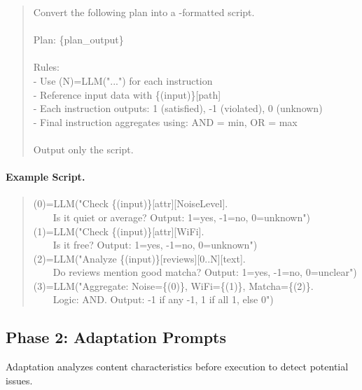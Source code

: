 \begin{quote}
\small\ttfamily
Convert the following plan into a \script-formatted script.\\
\\
Plan: \{plan\_output\}\\
\\
Rules:\\
- Use (N)=LLM("...") for each instruction\\
- Reference input data with \{(input)\}[path]\\
- Each instruction outputs: 1 (satisfied), -1 (violated), 0 (unknown)\\
- Final instruction aggregates using: AND = min, OR = max\\
\\
Output only the script.
\end{quote}

\paragraph{Example \script Script.}
\begin{quote}
\small\ttfamily
(0)=LLM("Check \{(input)\}[attr][NoiseLevel].\\
\ \ \ \ Is it quiet or average? Output: 1=yes, -1=no, 0=unknown")\\
(1)=LLM("Check \{(input)\}[attr][WiFi].\\
\ \ \ \ Is it free? Output: 1=yes, -1=no, 0=unknown")\\
(2)=LLM("Analyze \{(input)\}[reviews][0..N][text].\\
\ \ \ \ Do reviews mention good matcha? Output: 1=yes, -1=no, 0=unclear")\\
(3)=LLM("Aggregate: Noise=\{(0)\}, WiFi=\{(1)\}, Matcha=\{(2)\}.\\
\ \ \ \ Logic: AND. Output: -1 if any -1, 1 if all 1, else 0")
\end{quote}

\subsection{Phase 2: Adaptation Prompts}

Adaptation analyzes content characteristics before execution to detect potential issues.

